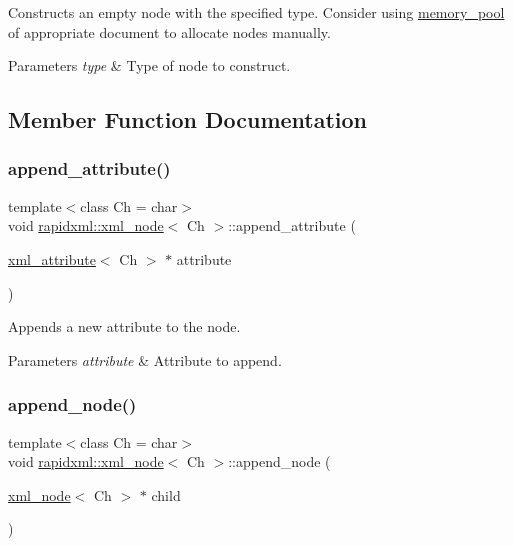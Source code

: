 Constructs an empty node with the specified type. Consider using \mbox{\hyperlink{classrapidxml_1_1memory__pool}{memory\+\_\+pool}} of appropriate document to allocate nodes manually. 
\begin{DoxyParams}{Parameters}
{\em type} & Type of node to construct. \\
\hline
\end{DoxyParams}


\subsection{Member Function Documentation}
\mbox{\label{classrapidxml_1_1xml__node_a33ce3386f8c42dd4db658b75cbb6e6c4}} 
\subsubsection{\texorpdfstring{append\+\_\+attribute()}{append\_attribute()}}
{\footnotesize\ttfamily template$<$class Ch = char$>$ \\
void \mbox{\hyperlink{classrapidxml_1_1xml__node}{rapidxml\+::xml\+\_\+node}}$<$ Ch $>$\+::append\+\_\+attribute (\begin{DoxyParamCaption}\item[{\mbox{\hyperlink{classrapidxml_1_1xml__attribute}{xml\+\_\+attribute}}$<$ Ch $>$ $\ast$}]{attribute }\end{DoxyParamCaption})\hspace{0.3cm}{\ttfamily [inline]}}

Appends a new attribute to the node. 
\begin{DoxyParams}{Parameters}
{\em attribute} & Attribute to append. \\
\hline
\end{DoxyParams}
\mbox{\label{classrapidxml_1_1xml__node_a8696d098ecc9c4d2a646b43e91d58e31}} 
\subsubsection{\texorpdfstring{append\+\_\+node()}{append\_node()}}
{\footnotesize\ttfamily template$<$class Ch = char$>$ \\
void \mbox{\hyperlink{classrapidxml_1_1xml__node}{rapidxml\+::xml\+\_\+node}}$<$ Ch $>$\+::append\+\_\+node (\begin{DoxyParamCaption}\item[{\mbox{\hyperlink{classrapidxml_1_1xml__node}{xml\+\_\+node}}$<$ Ch $>$ $\ast$}]{child }\end{DoxyParamCaption})\hspace{0.3cm}{\ttfamily [inline]}}

